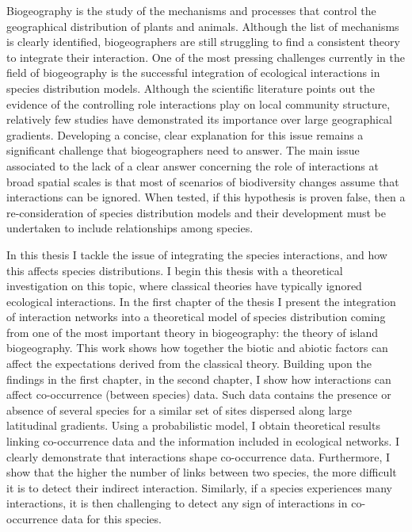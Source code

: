 Biogeography is the study of the mechanisms and processes that control
the geographical distribution of plants and animals. Although the list
of mechanisms is clearly identified, biogeographers are still struggling
to find a consistent theory to integrate their interaction. One of the
most pressing challenges currently in the field of biogeography is the
successful integration of ecological interactions in species
distribution models. Although the scientific literature points out the
evidence of the controlling role interactions play on local community
structure, relatively few studies have demonstrated its importance over
large geographical gradients. Developing a concise, clear explanation
for this issue remains a significant challenge that biogeographers need
to answer. The main issue associated to the lack of a clear answer
concerning the role of interactions at broad spatial scales is that most
of scenarios of biodiversity changes assume that interactions can be
ignored. When tested, if this hypothesis is proven false, then a
re-consideration of species distribution models and their development
must be undertaken to include relationships among species.

In this thesis I tackle the issue of integrating the species
interactions, and how this affects species distributions. I begin this
thesis with a theoretical investigation on this topic, where classical
theories have typically ignored ecological interactions. In the first
chapter of the thesis I present the integration of interaction networks
into a theoretical model of species distribution coming from one of the
most important theory in biogeography: the theory of island
biogeography. This work shows how together the biotic and abiotic
factors can affect the expectations derived from the classical theory.
Building upon the findings in the first chapter, in the second chapter,
I show how interactions can affect co-occurrence (between species) data.
Such data contains the presence or absence of several species for a
similar set of sites dispersed along large latitudinal gradients. Using
a probabilistic model, I obtain theoretical results linking
co-occurrence data and the information included in ecological networks.
I clearly demonstrate that interactions shape co-occurrence data.
Furthermore, I show that the higher the number of links between two
species, the more difficult it is to detect their indirect interaction.
Similarly, if a species experiences many interactions, it is then
challenging to detect any sign of interactions in co-occurrence data for
this species.

